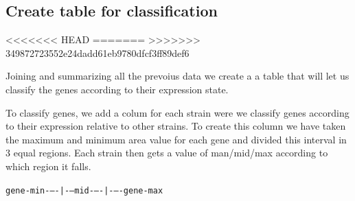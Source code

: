 \documentclass[11pt]{article}
\begin{document}
\subsection{Create table for classification}
<<<<<<< HEAD
\label{sec:orged8a6d3}
=======
\label{sec:org01967d0}
>>>>>>> 349872723552e24dadd61eb9780dfcf3ff89def6

Joining and summarizing all the prevoius data we create a a table that will let us classify the genes according to their expression state.

To classify genes, we add a colum for each strain were we classify genes according to their expression relative to other strains.
To create this column we have taken the maximum and minimum area value for each gene and divided this interval in 3 equal regions. Each strain then gets a value of man/mid/max according to which region it falls.

\texttt{gene-min-{}--{}-|-{}--mid-{}--{}-|-{}--{}-gene-max}
\end{document}
